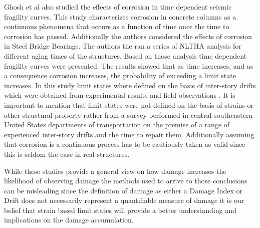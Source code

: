 Ghosh et al \cite{Ghosh2010} also studied the effects of corrosion in time dependent seismic fragility curves. This study characterizes corrosion in concrete columns as a continuous phenomena that occurs as a function of time once the time to corrosion has passed. Additionally the authors considered the effects of corrosion in Steel Bridge Bearings. The authors the ran a series of NLTHA analysis for different aging times of the structures. Based on those analysis time dependent fragility curves were presented. The results showed that as time increases, and as a consequence corrosion increases, the probability of exceeding a limit state increases. In this study limit states where defined on the basis of inter-story drifts which were obtained from experimental results and field observations \cite{Padgett2007}. It is important to mention that limit states were not defined on the basis of strains or other structural property rather from a survey performed in central southeastern United States departments of transportation on the premise of a range of experienced inter-story drifts and the time to repair them. Additionally assuming that corrosion is a continuous process has to be cautiously taken as valid since this is seldom the case in real structures.

While these studies provide a general view on how damage increases the likelihood of observing damage the methods used to arrive to those conclusions can be misleading since the definition of damage as either a Damage Index or Drift does not necessarily represent a quantifiable measure of damage it is our belief that strain based limit states will provide a better understanding and implications on the damage accumulation.